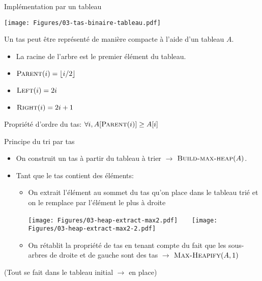 

\begin{frame}{Implémentation par un tableau}

\centerline{\texttt{[image: Figures/03-tas-binaire-tableau.pdf]}}

\bigskip

Un tas peut être représenté de manière compacte à l'aide d'un tableau $A$.

\begin{itemize}
\item La racine de l'arbre est le premier élément du tableau.
\item $\textnormal{\scshape Parent}(i)=\lfloor i/2\rfloor$
\item $\textnormal{\scshape Left}(i)=2i$
\item $\textnormal{\scshape Right}(i)=2i+1$
\end{itemize}

Propriété d'ordre du tas: $\forall i, A[\textnormal{\scshape Parent}(i)]\geq A[i]$

\end{frame}

\begin{frame}{Principe du tri par tas}
\begin{itemize}
\item On construit un tas à partir du tableau à trier $\rightarrow$ $\textnormal{\scshape Build-max-heap}(A)$.
\item Tant que le tas contient des éléments:
\begin{itemize}
\item On extrait l'élément au sommet du tas qu'on place dans le
  tableau trié et on le remplace par l'élément le plus à droite

\centerline{\texttt{[image: Figures/03-heap-extract-max2.pdf]}~~~~\texttt{[image: Figures/03-heap-extract-max2-2.pdf]}}

\item On rétablit la propriété de tas en tenant compte du fait que les sous-arbres de droite et de gauche sont des tas $\rightarrow$ $\textnormal{\scshape Max-Heapify}(A,1)$ 
\end{itemize}
\end{itemize}
(Tout se fait dans le tableau initial $\rightarrow$ en place)
\end{frame}


